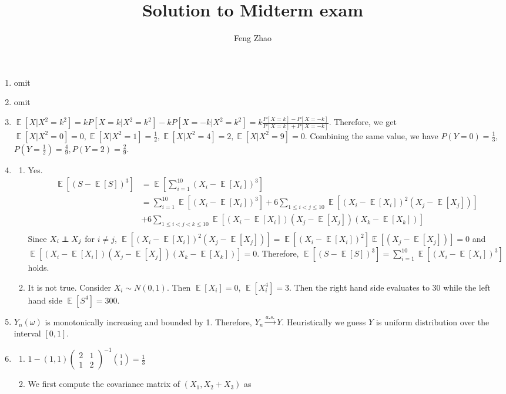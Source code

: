 \documentclass{article}
\author{Feng Zhao}
\title{Solution to Midterm exam}
\DeclareMathOperator{\E}{\mathbb{E}}
\newcommand\independent{\protect\mathpalette{\protect\independenT}{\perp}}
\def\independenT#1#2{\mathrel{\rlap{$#1#2$}\mkern2mu{#1#2}}}
\begin{document}
\maketitle
\begin{enumerate}
    \item omit
    \item omit
    \item $\E[X|X^2=k^2]
=kP[X=k|X^2=k^2]-kP[X=-k|X^2=k^2]
=k\frac{P[X=k]-P[X=-k]}{P[X=k]+P[X=-k]}$.
Therefore, we get $\E[X|X^2=0]=0,\E[X|X^2=1]=\frac{1}{2},
\E[X|X^2=4]=2,\E[X|X^2=9]=0$.
Combining the same value, we have $P(Y=0)=\frac{1}{3}$,
$P(Y=\frac{1}{2})=\frac{4}{9},P(Y=2)=\frac{2}{9}$.
\item
\begin{enumerate}
    \item Yes. 
    \begin{align*}
        \E[(S-\E[S])^3] &=
        \E[\sum_{i=1}^{10} (X_i - \E[X_i])^3]
        \\
        &=\sum_{i=1}^{10} \E[(X_i-\E[X_i])^3] + 6
        \sum_{1\leq i < j \leq 10}\E[(X_i-\E[X_i])^2(X_j-\E[X_j])]
        \\
        &+ 6
        \sum_{1\leq i < j <k \leq 10}\E[(X_i-\E[X_i])(X_j-\E[X_j])(X_k-\E[X_k])]\\
    \end{align*}
    Since $X_i \independent X_j$ for $i\neq j$,
    $\E[(X_i-\E[X_i])^2(X_j-\E[X_j])]=\E[(X_i-\E[X_i])^2]\E[(X_j-\E[X_j])]=0$
    and $\E[(X_i-\E[X_i])(X_j-\E[X_j])(X_k-\E[X_k])] = 0$.
    Therefore, $ \E[(S-\E[S])^3] = \sum_{i=1}^{10} \E[(X_i-\E[X_i])^3]$ holds.
    \item It is not true. Consider $X_i \sim N(0,1)$. Then $\E[X_i]=0$,
    $\E[X^4_i]=3$. Then the right hand side evaluates to 30 while
    the left hand side $\E[S^4]=300$.
\end{enumerate}
\item $Y_n(\omega)$ is monotonically increasing and bounded by 1.
Therefore, $Y_n \xrightarrow{a.s.} Y$. Heuristically we guess $Y$ is uniform distribution
over the interval $[0,1]$.
\item \begin{enumerate}
    \item $1 - (1,1)\begin{pmatrix}2&1\\1&2\end{pmatrix}^{-1}\binom{1}{1}= \frac{1}{3}$
    \item  We first compute the covariance matrix of $(X_1, X_2+X_3) $ as 

\end{enumerate}
\end{enumerate}
\end{document}
